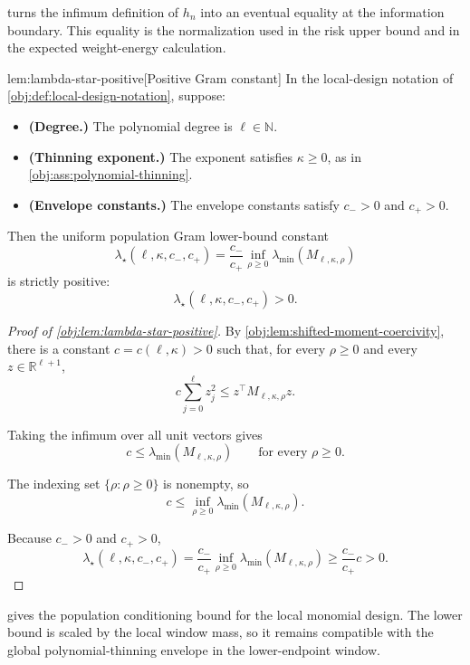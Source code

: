 \documentclass[11pt]{article}
\begin{document}
 turns the infimum definition of \(h_n\) into an eventual equality at the information boundary. This equality is the normalization used in the risk upper bound and in the expected weight-energy calculation.

\begin{lemmav}{lem:lambda-star-positive}[Positive Gram constant]
In the local-design notation of \cref{obj:def:local-design-notation}, suppose:
\begin{itemize}
\item \textbf{(Degree.)} The polynomial degree is \(\ell\in\mathbb N\).
\item \textbf{(Thinning exponent.)} The exponent satisfies \(\kappa\ge 0\), as in \cref{obj:ass:polynomial-thinning}.
\item \textbf{(Envelope constants.)} The envelope constants satisfy \(c_->0\) and \(c_+>0\).
\end{itemize}
Then the uniform population Gram lower-bound constant
\[
\lambda_\star(\ell,\kappa,c_-,c_+)
=
\frac{c_-}{c_+}\inf_{\rho\ge 0}\lambda_{\min}(M_{\ell,\kappa,\rho})
\]
is strictly positive:
\[
\lambda_\star(\ell,\kappa,c_-,c_+)>0.
\]
\end{lemmav}

\begin{proof}[Proof of \cref{obj:lem:lambda-star-positive}]
By \cref{obj:lem:shifted-moment-coercivity}, there is a constant
\(c=c(\ell,\kappa)>0\) such that, for every \(\rho\ge0\) and every
\(z\in\mathbb R^{\ell+1}\),
\[
c\sum_{j=0}^{\ell}z_j^2
\le
z^\top M_{\ell,\kappa,\rho}z .
\] %

Taking the infimum over all unit vectors gives
\[
c\le \lambda_{\min}(M_{\ell,\kappa,\rho})
\qquad\text{for every }\rho\ge0 .
\] %

The indexing set \(\{\rho:\rho\ge0\}\) is nonempty, so
\[
c
\le
\inf_{\rho\ge0}\lambda_{\min}(M_{\ell,\kappa,\rho}).
\] %

Because \(c_->0\) and \(c_+>0\),
\[
\lambda_\star(\ell,\kappa,c_-,c_+)
=
\frac{c_-}{c_+}\inf_{\rho\ge0}
\lambda_{\min}(M_{\ell,\kappa,\rho})
\ge
\frac{c_-}{c_+}c
>
0 .
\] %
\end{proof}

 gives the population conditioning bound for the local monomial design. The lower bound is scaled by the local window mass, so it remains compatible with the global polynomial-thinning envelope in the lower-endpoint window.
\end{document}
